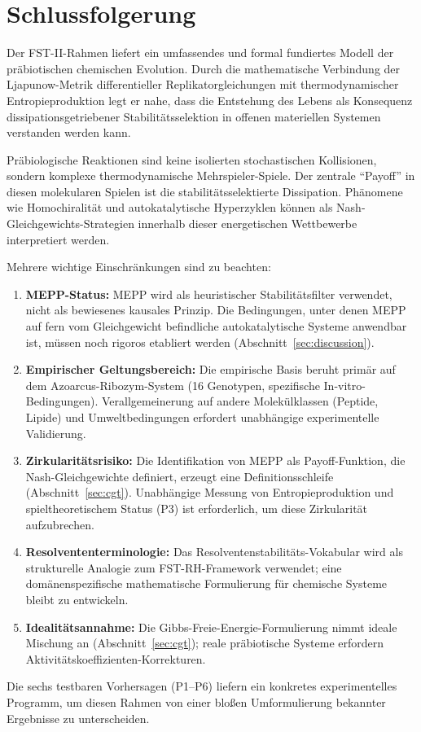 \documentclass[12pt,a4paper]{article}
\theoremstyle{remark}
\begin{document}
\section{Schlussfolgerung}
\label{sec:conclusion}

Der FST-II-Rahmen liefert ein umfassendes und formal fundiertes Modell der pr\"abiotischen chemischen Evolution. Durch die mathematische Verbindung der Ljapunow-Metrik differentieller Replikatorgleichungen mit thermodynamischer Entropieproduktion \citep{ReplicatorEntropy} legt er nahe, dass die Entstehung des Lebens als Konsequenz dissipationsgetriebener Stabilit\"atsselektion in offenen materiellen Systemen verstanden werden kann.

Pr\"abiologische Reaktionen sind keine isolierten stochastischen Kollisionen, sondern komplexe thermodynamische Mehrspieler-Spiele. Der zentrale ``Payoff'' in diesen molekularen Spielen ist die stabilit\"atsselektierte Dissipation. Ph\"anomene wie Homochiralit\"at und autokatalytische Hyperzyklen k\"onnen als Nash-Gleichgewichts-Strategien innerhalb dieser energetischen Wettbewerbe interpretiert werden.

Mehrere wichtige Einschr\"ankungen sind zu beachten:
\begin{enumerate}[label=(L\arabic*)]
    \item \textbf{MEPP-Status:} MEPP wird als heuristischer Stabilit\"atsfilter verwendet, nicht als bewiesenes kausales Prinzip. Die Bedingungen, unter denen MEPP auf fern vom Gleichgewicht befindliche autokatalytische Systeme anwendbar ist, m\"ussen noch rigoros etabliert werden (Abschnitt~\ref{sec:discussion}).
    \item \textbf{Empirischer Geltungsbereich:} Die empirische Basis beruht prim\"ar auf dem Azoarcus-Ribozym-System (16 Genotypen, spezifische In-vitro-Bedingungen). Verallgemeinerung auf andere Molek\"ulklassen (Peptide, Lipide) und Umweltbedingungen erfordert unabh\"angige experimentelle Validierung.
    \item \textbf{Zirkularit\"atsrisiko:} Die Identifikation von MEPP als Payoff-Funktion, die Nash-Gleichgewichte definiert, erzeugt eine Definitionsschleife (Abschnitt~\ref{sec:cgt}). Unabh\"angige Messung von Entropieproduktion und spieltheoretischem Status (P3) ist erforderlich, um diese Zirkularit\"at aufzubrechen.
    \item \textbf{Resolvententerminologie:} Das Resolventenstabilit\"ats-Vokabular wird als strukturelle Analogie zum FST-RH-Framework verwendet; eine dom\"anenspezifische mathematische Formulierung f\"ur chemische Systeme bleibt zu entwickeln.
    \item \textbf{Idealit\"atsannahme:} Die Gibbs-Freie-Energie-Formulierung nimmt ideale Mischung an (Abschnitt~\ref{sec:cgt}); reale pr\"abiotische Systeme erfordern Aktivit\"atskoeffizienten-Korrekturen.
\end{enumerate}
Die sechs testbaren Vorhersagen (P1--P6) liefern ein konkretes experimentelles Programm, um diesen Rahmen von einer blo\ss{}en Umformulierung bekannter Ergebnisse zu unterscheiden.
\end{document}
